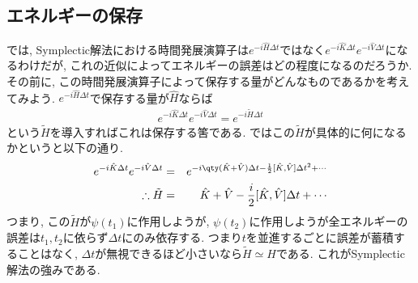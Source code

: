 \documentclass[10.5pt,a4paper]{jreport}
\begin{document}
\subsection{エネルギーの保存}
では, Symplectic解法における時間発展演算子は$e^{-i\hat{H}\Delta t}$ではなく$e^{-i\hat{K}\Delta t}e^{-i\hat{V}\Delta t}$になるわけだが, これの近似によってエネルギーの誤差はどの程度になるのだろうか. その前に, この時間発展演算子によって保存する量がどんなものであるかを考えてみよう. $e^{-i\hat{H}\Delta t}$で保存する量が$\hat{H}$ならば
\begin{eqnarray}
  e^{-i\hat{K}\Delta t}e^{-i\hat{V}\Delta t} = e^{-i\tilde{H}\Delta t}
\end{eqnarray}
という$\tilde{H}$を導入すればこれは保存する筈である. ではこの$\tilde{H}$が具体的に何になるかというと以下の通り. 
\begin{eqnarray}
  e^{-i\hat{K}\Delta t}e^{-i\hat{V}\Delta t} &=& e^{-i\qty(\hat{K}+\hat{V})\Delta t -\frac{1}{2}[\hat{K}, \hat{V}]\Delta t^2 + \cdots}\\
  \therefore \tilde{H} &=& \hat{K}+\hat{V} -\frac{i}{2}[\hat{K}, \hat{V}]\Delta t + \cdots
\end{eqnarray}
つまり, この$\tilde{H}$が$\psi(t_1)$に作用しようが, $\psi(t_2)$に作用しようが全エネルギーの誤差は$t_1, t_2$に依らず$\Delta t$にのみ依存する. つまり$t$を並進するごとに誤差が蓄積することはなく, $\Delta t$が無視できるほど小さいなら$\tilde{H} \simeq H$である. これがSymplectic解法の強みである.
\end{document}
